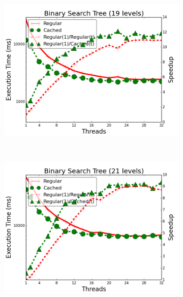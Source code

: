 \begin{figure}[]
        \centering
        \begin{subfigure}[b]{\plotsize\textwidth}
           \includegraphics[width=\textwidth]{experiments/threads/cmp-key-value-19-ten.png}
           \label{fig:threads:key_value_19}
        \end{subfigure}
        ~
        \begin{subfigure}[b]{\plotsize\textwidth}
           \includegraphics[width=\textwidth]{experiments/threads/cmp-key-value-21-ten.png}
           \label{fig:threads:key_value_21}
        \end{subfigure} \\


        \label{fig:threads:results_key_value}
\end{figure}

\clearpage
